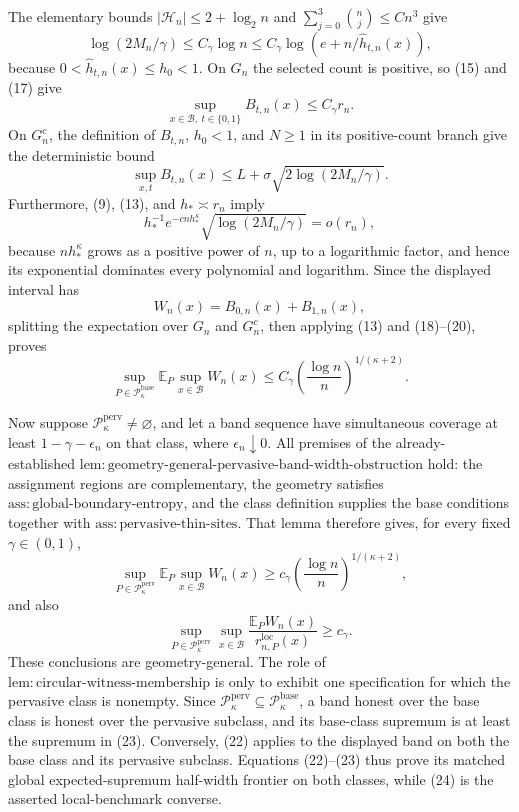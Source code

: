 The elementary bounds \(|\mathcal H_n|\le 2+\log_2 n\) and \(\sum_{j=0}^3\binom nj\le Cn^3\) give
\[
 \log(2M_n/\gamma)\le C_\gamma\log n
 \le C_\gamma\log(e+n/\widehat h_{t,n}(x)), \tag{17}
\]
because \(0<\widehat h_{t,n}(x)\le h_0<1\).  On \(G_n\) the selected count is positive, so (15) and (17) give
\[
 \sup_{x\in\mathcal B,\ t\in\{0,1\}}B_{t,n}(x)\le C_\gamma r_n. \tag{18}
\]
On \(G_n^c\), the definition of \(B_{t,n}\), \(h_0<1\), and \(N\ge1\) in its positive-count branch give the deterministic bound
\[
 \sup_{x,t}B_{t,n}(x)\le L+\sigma\sqrt{2\log(2M_n/\gamma)}. \tag{19}
\]
Furthermore, (9), (13), and \(h_*\asymp r_n\) imply
\[
 h_*^{-1}e^{-cnh_*^\kappa}\sqrt{\log(2M_n/\gamma)}=o(r_n), \tag{20}
\]
because \(nh_*^\kappa\) grows as a positive power of \(n\), up to a logarithmic factor, and hence its exponential dominates every polynomial and logarithm.  Since the displayed interval has
\[
 W_n(x)=B_{0,n}(x)+B_{1,n}(x), \tag{21}
\]
splitting the expectation over \(G_n\) and \(G_n^c\), then applying (13) and (18)--(20), proves
\[
 \sup_{P\in\mathcal P_\kappa^{\mathrm{base}}}
 \mathbb E_P\sup_{x\in\mathcal B}W_n(x)\le
 C_\gamma\left(\frac{\log n}{n}\right)^{1/(\kappa+2)}. \tag{22}
\]

Now suppose \(\mathcal P_\kappa^{\mathrm{perv}}\ne\varnothing\), and let a band sequence have simultaneous coverage at least \(1-\gamma-\epsilon_n\) on that class, where \(\epsilon_n\downarrow0\).  All premises of the already-established \(\mathrm{lem:geometry\text{-}general\text{-}pervasive\text{-}band\text{-}width\text{-}obstruction}\) hold: the assignment regions are complementary, the geometry satisfies \(\mathrm{ass:global\text{-}boundary\text{-}entropy}\), and the class definition supplies the base conditions together with \(\mathrm{ass:pervasive\text{-}thin\text{-}sites}\).  That lemma therefore gives, for every fixed \(\gamma\in(0,1)\),
\[
 \sup_{P\in\mathcal P_\kappa^{\mathrm{perv}}}
 \mathbb E_P\sup_{x\in\mathcal B}W_n(x)\ge
 c_\gamma\left(\frac{\log n}{n}\right)^{1/(\kappa+2)}, \tag{23}
\]
and also
\[
 \sup_{P\in\mathcal P_\kappa^{\mathrm{perv}}}\sup_{x\in\mathcal B}
 \frac{\mathbb E_PW_n(x)}{r_{n,P}^{\mathrm{loc}}(x)}\ge c_\gamma. \tag{24}
\]
These conclusions are geometry-general.  The role of \(\mathrm{lem:circular\text{-}witness\text{-}membership}\) is only to exhibit one specification for which the pervasive class is nonempty.  Since \(\mathcal P_\kappa^{\mathrm{perv}}\subseteq\mathcal P_\kappa^{\mathrm{base}}\), a band honest over the base class is honest over the pervasive subclass, and its base-class supremum is at least the supremum in (23).  Conversely, (22) applies to the displayed band on both the base class and its pervasive subclass.  Equations (22)--(23) thus prove its matched global expected-supremum half-width frontier on both classes, while (24) is the asserted local-benchmark converse.

